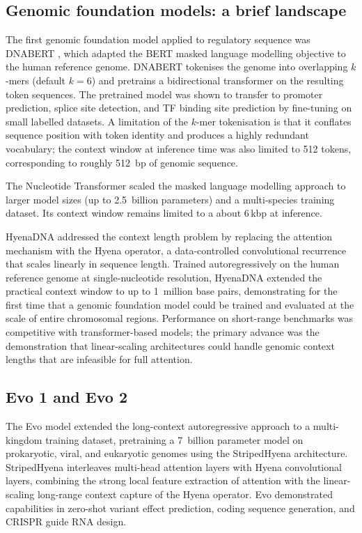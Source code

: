 \subsection{Genomic foundation models: a brief landscape}

The first genomic foundation model applied to regulatory sequence was DNABERT \cite{jiDNABERTPretrainedBidirectional2021a}, which adapted the BERT masked language modelling objective to the human reference genome.
DNABERT tokenises the genome into overlapping $k$-mers (default $k = 6$) and pretrains a bidirectional transformer on the resulting token sequences.
The pretrained model was shown to transfer to promoter prediction, splice site detection, and TF binding site prediction by fine-tuning on small labelled datasets.
A limitation of the $k$-mer tokenisation is that it conflates sequence position with token identity and produces a highly redundant vocabulary;
the context window at inference time was also limited to 512 tokens, corresponding to roughly 512~bp of genomic sequence.

The Nucleotide Transformer \cite{dalla-torreNucleotideTransformerBuilding2025} scaled the masked language modelling approach to larger model sizes (up to 2.5~billion parameters) and a multi-species training dataset.
Its context window remains limited to a about 6\,kbp at inference.

HyenaDNA \cite{nguyenHyenaDNALongRangeGenomic2023} addressed the context length problem by
replacing the attention mechanism with the Hyena operator, a data-controlled convolutional
recurrence that scales linearly in sequence length.
Trained autoregressively on the human reference genome at single-nucleotide resolution,
HyenaDNA extended the practical context window to up to 1~million base pairs, demonstrating
for the first time that a genomic foundation model could be trained and evaluated at the scale
of entire chromosomal regions.
Performance on short-range benchmarks was competitive with transformer-based models;
the primary advance was the demonstration that linear-scaling architectures could handle
genomic context lengths that are infeasible for full attention.

\subsection{Evo 1 and Evo 2}
\label{sec:evo2bg}

The Evo model \cite{nguyenSequenceModelingDesign2024} extended the long-context autoregressive
approach to a multi-kingdom training dataset, pretraining a 7~billion parameter model on
prokaryotic, viral, and eukaryotic genomes using the StripedHyena architecture.
StripedHyena interleaves multi-head attention layers with Hyena convolutional layers,
combining the strong local feature extraction of attention with the linear-scaling long-range
context capture of the Hyena operator.
Evo demonstrated capabilities in zero-shot variant effect prediction, coding sequence
generation, and CRISPR guide RNA design.

